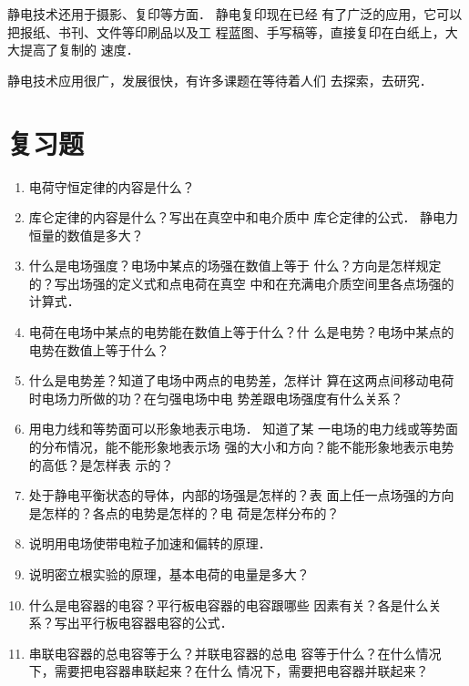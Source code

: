 静电技术还用于摄影、复印等方面．
静电复印现在已经
有了广泛的应用，它可以把报纸、书刊、文件等印刷品以及工
程蓝图、手写稿等，直接复印在白纸上，大大提高了复制的
速度．

静电技术应用很广，发展很快，有许多课题在等待着人们
去探索，去研究．

\section*{复习题}
\begin{enumerate}
\item 电荷守恒定律的内容是什么？
\item 库仑定律的内容是什么？写出在真空中和电介质中
库仑定律的公式．
静电力恒量的数值是多大？
\item 什么是电场强度？电场中某点的场强在数值上等于
什么？方向是怎样规定的？写出场强的定义式和点电荷在真空
中和在充满电介质空间里各点场强的计算式．
\item 电荷在电场中某点的电势能在数值上等于什么？什
么是电势？电场中某点的电势在数值上等于什么？
\item 什么是电势差？知道了电场中两点的电势差，怎样计
算在这两点间移动电荷时电场力所做的功？在匀强电场中电
势差跟电场强度有什么关系？
\item 用电力线和等势面可以形象地表示电场．
知道了某
一电场的电力线或等势面的分布情况，能不能形象地表示场
强的大小和方向？能不能形象地表示电势的高低？是怎样表
示的？
\item 处于静电平衡状态的导体，内部的场强是怎样的？表
面上任一点场强的方向是怎样的？各点的电势是怎样的？电
荷是怎样分布的？
\item 说明用电场使带电粒子加速和偏转的原理．
\item 说明密立根实验的原理，基本电荷的电量是多大？
\item 什么是电容器的电容？平行板电容器的电容跟哪些
因素有关？各是什么关系？写出平行板电容器电容的公式．
\item 串联电容器的总电容等于么？并联电容器的总电
容等于什么？在什么情况下，需要把电容器串联起来？在什么
情况下，需要把电容器并联起来？
\end{enumerate}

